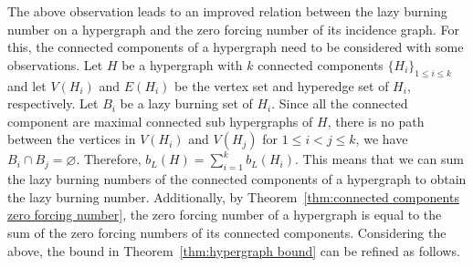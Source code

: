 \documentclass[12pt]{article}
\theoremstyle{plain}
\theoremstyle{definition}
\theoremstyle{remark}
\begin{document}
The above observation leads to an improved relation between the lazy burning number on a hypergraph and the zero forcing number of its incidence graph.
For this, the connected components of a hypergraph need to be considered with some observations.
Let $H$ be a hypergraph with $k$ connected components $\{H_i\}_{1\leq i\leq k}$ and let $V(H_i)$ and $E(H_i)$ be the vertex set and hyperedge set of $H_i$, respectively. 
Let $B_i$ be a lazy burning set of $H_i$. 
Since all the connected component are maximal connected sub hypergraphs of $H$, there is no path between the vertices in $V(H_i)$ and $V(H_j)$ for $1\leq i < j \leq k$, we have $B_i\cap B_j = \varnothing$.
Therefore, $b_L(H) = \sum_{i=1}^k b_L(H_i)$.
This means that we can sum the lazy burning numbers of the connected components of a hypergraph to obtain the lazy burning number.
Additionally, by Theorem~\ref{thm:connected components zero forcing number}, the zero forcing number of a hypergraph is equal to the sum of the zero forcing numbers of its connected components.
Considering the above, the bound in Theorem~\ref{thm:hypergraph bound} can be refined as follows.
\end{document}
